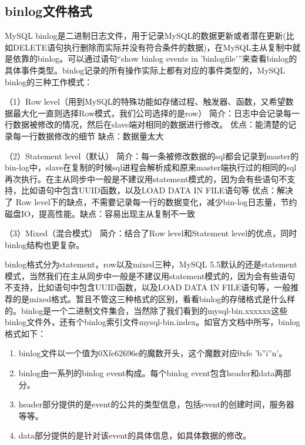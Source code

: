 \documentclass[../../../interview-questions.tex]{subfiles}
\begin{document}
\subsection{binlog文件格式}

MySQL binlog是二进制日志文件，用于记录MySQL的数据更新或者潜在更新(比如DELETE语句执行删除而实际并没有符合条件的数据)，在MySQL主从复制中就是依靠的binlog。可以通过语句“show binlog events in 'binlogfile'”来查看binlog的具体事件类型。binlog记录的所有操作实际上都有对应的事件类型的，MySQL binlog的三种工作模式：

（1）Row level（用到MySQL的特殊功能如存储过程、触发器、函数，又希望数据最大化一直则选择Row模式，我们公司选择的是row）
简介：日志中会记录每一行数据被修改的情况，然后在slave端对相同的数据进行修改。
优点：能清楚的记录每一行数据修改的细节
缺点：数据量太大

（2）Statement level（默认）
简介：每一条被修改数据的sql都会记录到master的bin-log中，slave在复制的时候sql进程会解析成和原来master端执行过的相同的sql再次执行。在主从同步中一般是不建议用statement模式的，因为会有些语句不支持，比如语句中包含UUID函数，以及LOAD DATA IN FILE语句等
优点：解决了 Row level下的缺点，不需要记录每一行的数据变化，减少bin-log日志量，节约磁盘IO，提高性能。缺点：容易出现主从复制不一致

（3）Mixed（混合模式）
简介：结合了Row level和Statement level的优点，同时binlog结构也更复杂。


binlog格式分为statement，row以及mixed三种，MySQL 5.5默认的还是statement模式，当然我们在主从同步中一般是不建议用statement模式的，因为会有些语句不支持，比如语句中包含UUID函数，以及LOAD DATA IN FILE语句等，一般推荐的是mixed格式。暂且不管这三种格式的区别，看看binlog的存储格式是什么样的。binlog是一个二进制文件集合，当然除了我们看到的mysql-bin.xxxxxx这些binlog文件外，还有个binlog索引文件mysql-bin.index。如官方文档中所写，binlog格式如下：

\begin{enumerate}
\item{binlog文件以一个值为0Xfe62696e的魔数开头，这个魔数对应0xfe 'b''i''n'。}
\item{binlog由一系列的binlog event构成。每个binlog event包含header和data两部分。}
\item{header部分提供的是event的公共的类型信息，包括event的创建时间，服务器等等。}
\item{data部分提供的是针对该event的具体信息，如具体数据的修改。}
\end{enumerate}
\end{document}
